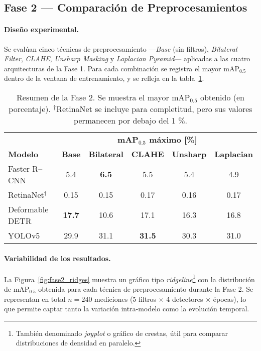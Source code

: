 \subsection{Fase 2 — Comparación de Preprocesamientos}
\label{ssec:fase2}

\paragraph{Diseño experimental.}
Se evalúan cinco técnicas de preprocesamiento —\textit{Base} (sin filtros), \textit{Bilateral Filter}, \textit{CLAHE}, \textit{Unsharp Masking} y \textit{Laplacian Pyramid}— aplicadas a las cuatro arquitecturas de la Fase 1.
Para cada combinación se registra el mayor mAP\(_{0.5}\) dentro de la ventana de entrenamiento, y se refleja en la tabla~\ref{tab:fase2_map}.

\begin{table}[!ht]
  \centering
  \begin{tabular}{lccccc}
    \hline
                     & \multicolumn{5}{c}{\textbf{mAP\(_{0.5}\) máximo [\%]}}\\
    \cline{2-6}
    \textbf{Modelo}  & \textbf{Base} & \textbf{Bilateral} & \textbf{CLAHE} & \textbf{Unsharp} & \textbf{Laplacian}\\
    \hline
    Faster R–CNN         & 5.4  & \textbf{6.5} & 5.5  & 5.4  & 4.9  \\
    RetinaNet$^\dagger$  & 0.15 & 0.15         & 0.17 & 0.16 & 0.17 \\
    Deformable DETR      & \textbf{17.7} & 10.6 & 17.1 & 16.3 & 16.8 \\
    YOLOv5               & 29.9 & 31.1 & \textbf{31.5} & 30.3 & 31.0 \\
    \hline
  \end{tabular}
  \caption[Mejor mAP por técnica de preprocesamiento]{Resumen de la Fase 2. Se muestra el mayor mAP\(_{0.5}\) obtenido (en porcentaje). $^\dagger$RetinaNet se incluye para completitud, pero sus valores permanecen por debajo del 1 \%.}
  \label{tab:fase2_map}
\end{table}


\paragraph{Variabilidad de los resultados.}
La Figura~\ref{fig:fase2_ridges} muestra un gráfico tipo \emph{ridgeline}\footnote{También denominado \emph{joyplot} o gráfico de crestas, útil para comparar distribuciones de densidad en paralelo.} con la distribución de mAP\(_{0.5}\) obtenida para cada técnica de preprocesamiento durante la Fase 2.
Se representan en total \(n=240\) mediciones (5 filtros \(\times\) 4 detectores \(\times\) épocas), lo que permite captar tanto la variación intra-modelo como la evolución temporal.

